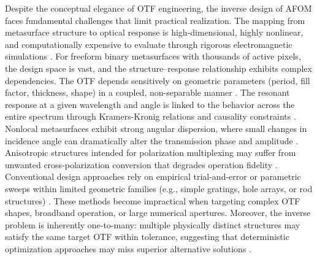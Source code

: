 Despite the conceptual elegance of OTF engineering, the inverse design of AFOM faces fundamental challenges that limit practical realization. The mapping from metasurface structure to optical response is high-dimensional, highly nonlinear, and computationally expensive to evaluate through rigorous electromagnetic simulations \cite{molesky2018}. For freeform binary metasurfaces with thousands of active pixels, the design space is vast, and the structure--response relationship exhibits complex dependencies. The OTF depends sensitively on geometric parameters (period, fill factor, thickness, shape) in a coupled, non-separable manner \cite{sell2017}. The resonant response at a given wavelength and angle is linked to the behavior across the entire spectrum through Kramers-Kronig relations and causality constraints \cite{wesemann2021review}. Nonlocal metasurfaces exhibit strong angular dispersion, where small changes in incidence angle can dramatically alter the transmission phase and amplitude \cite{guo2018laplace}. Anisotropic structures intended for polarization multiplexing may suffer from unwanted cross-polarization conversion that degrades operation fidelity \cite{deng2024}. Conventional design approaches rely on empirical trial-and-error or parametric sweeps within limited geometric families (e.g., simple gratings, hole arrays, or rod structures) \cite{kwon2018,cordaro2019}. These methods become impractical when targeting complex OTF shapes, broadband operation, or large numerical apertures. Moreover, the inverse problem is inherently one-to-many: multiple physically distinct structures may satisfy the same target OTF within tolerance, suggesting that deterministic optimization approaches may miss superior alternative solutions \cite{piggott2015,piggott2017}.

